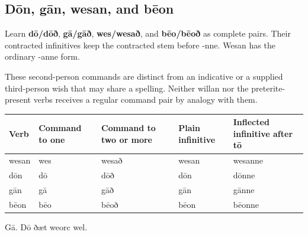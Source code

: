 \subsection*{Dōn, gān, wesan, and bēon}

Learn \textbf{dō/\allowbreak{}dōð}, \textbf{gā/\allowbreak{}gāð}, \textbf{wes/\allowbreak{}wesað}, and \textbf{bēo/\allowbreak{}bēoð} as complete pairs. Their contracted infinitives keep the contracted stem before -nne. Wesan has the ordinary -anne form.

These second-person commands are distinct from an indicative or a supplied third-person wish that may share a spelling. Neither willan nor the preterite-present verbs receives a regular command pair by analogy with them.

\par\begingroup
\fontsize{10.5}{13.2}\selectfont
\setlength{\LTleft}{0pt}\setlength{\LTright}{\fill}
\noindent
\begin{tabular}{@{}>{\raggedright\arraybackslash}p{17.31mm}>{\raggedright\arraybackslash}p{17.57mm}>{\raggedright\arraybackslash}p{23.8mm}>{\raggedright\arraybackslash}p{21.98mm}>{\raggedright\arraybackslash}p{32.1mm}@{}}
\toprule
\textbf{Verb} & \textbf{Command to one} & \textbf{Command to two or more} & \textbf{Plain infinitive} & \textbf{Inflected infinitive after tō} \\
\midrule
wesan & wes & wesað & wesan & wesanne \\
dōn & dō & dōð & dōn & dōnne \\
gān & gā & gāð & gān & gānne \\
bēon & bēo & bēoð & bēon & bēonne \\
\bottomrule
\end{tabular}
\par\endgroup

Gā. Dō ðæt weorc wel.

